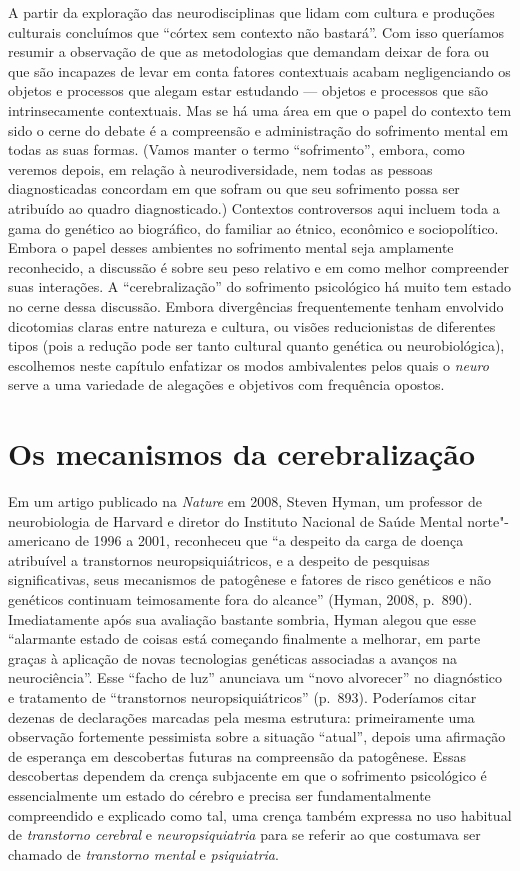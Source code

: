 A partir da exploração das neurodisciplinas que lidam com cultura e
produções culturais concluímos que ``córtex sem contexto não bastará''.
Com isso queríamos resumir a observação de que as metodologias que
demandam deixar de fora ou que são incapazes de levar em conta fatores
contextuais acabam negligenciando os objetos e processos que alegam
estar estudando --- objetos e processos que são intrinsecamente
contextuais. Mas se há uma área em que o papel do contexto tem sido o
cerne do debate é a compreensão e administração do sofrimento mental em
todas as suas formas. (Vamos manter o termo ``sofrimento'', embora, como
veremos depois, em relação à neurodiversidade, nem todas as pessoas
diagnosticadas concordam em que sofram ou que seu sofrimento possa ser
atribuído ao quadro diagnosticado.) Contextos controversos aqui incluem
toda a gama do genético ao biográfico, do familiar ao étnico, econômico
e sociopolítico. Embora o papel desses ambientes no sofrimento mental
seja amplamente reconhecido, a discussão é sobre seu peso relativo e em
como melhor compreender suas interações. A ``cerebralização'' do
sofrimento psicológico há muito tem estado no cerne dessa discussão.
Embora divergências frequentemente tenham envolvido dicotomias claras
entre natureza e cultura, ou visões reducionistas de diferentes tipos
(pois a redução pode ser tanto cultural quanto genética ou
neurobiológica), escolhemos neste capítulo enfatizar os modos
ambivalentes pelos quais o \emph{neuro} serve a uma variedade de
alegações e objetivos com frequência opostos.

\section{Os mecanismos da cerebralização}

Em um artigo publicado na \emph{Nature} em 2008, Steven Hyman, um
professor de neurobiologia de Harvard e diretor do Instituto Nacional de
Saúde Mental norte"-americano de 1996 a 2001, reconheceu que ``a despeito
da carga de doença atribuível a transtornos neuropsiquiátricos, e a
despeito de pesquisas significativas, seus mecanismos de patogênese e
fatores de risco genéticos e não genéticos continuam teimosamente fora
do alcance'' (Hyman, 2008, p.~890). Imediatamente após sua avaliação
bastante sombria, Hyman alegou que esse ``alarmante estado de coisas
está começando finalmente a melhorar, em parte graças à aplicação de
novas tecnologias genéticas associadas a avanços na neurociência''. Esse
``facho de luz'' anunciava um ``novo alvorecer'' no diagnóstico e
tratamento de ``transtornos neuropsiquiátricos'' (p.~893). Poderíamos
citar dezenas de declarações marcadas pela mesma estrutura:
primeiramente uma observação fortemente pessimista sobre a situação
``atual'', depois uma afirmação de esperança em descobertas futuras na
compreensão da patogênese. Essas descobertas dependem da crença
subjacente em que o sofrimento psicológico é essencialmente um estado do
cérebro e precisa ser fundamentalmente compreendido e explicado como
tal, uma crença também expressa no uso habitual de \emph{transtorno
cerebral} e \emph{neuropsiquiatria} para se referir ao que costumava ser
chamado de \emph{transtorno mental} e \emph{psiquiatria}.

